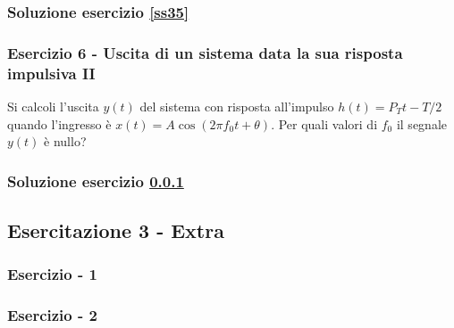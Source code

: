 \documentclass[../main.tex]{subfiles}
\begin{document}
\subsubsection*{Soluzione esercizio \ref{ss35}}


\vspace*{1.5cm}
\subsubsection{Esercizio 6 - Uscita di un sistema data la sua risposta impulsiva II}
\label{ss36}

Si calcoli l’uscita $y(t)$ del sistema con risposta all’impulso $h(t) = P_T t-
T/2$ quando l’ingresso è $x(t) = A\cos (2\pi f_0 t+ \theta)$. Per quali valori di $f_0$ il segnale $y(t)$ è nullo?


\subsubsection*{Soluzione esercizio \ref{ss36}}


\subsection{Esercitazione 3 - Extra}

\subsubsection{Esercizio - 1 }
\subsubsection{Esercizio - 2 }
\end{document}
